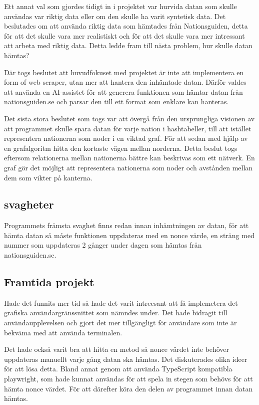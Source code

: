 \documentclass[a4paper, 12pt]{article}
\begin{document}
        Ett annat val som gjordes tidigt in i projektet var hurvida datan som skulle användas var riktig data eller om den skulle ha varit syntetisk data. Det beslutades om att använda riktig data som hämtades från Nationsguiden, detta för att det skulle vara mer realistiskt och för att det skulle vara mer intressant att arbeta med riktig data. Detta ledde fram till nästa problem, hur skulle datan hämtas? 


        Där togs beslutet att huvudfokuset med projektet är inte att implementera en form of web scraper, utan mer att hantera den inhämtade datan. Därför valdes att använda en AI-assistet för att generera funktionen som hämtar datan från nationsguiden.se och parsar den till ett format som enklare kan hanteras.

        
        Det sista stora beslutet som togs var att övergå från den ursprungliga visionen av att programmet skulle spara datan för varje nation i hashtabeller, till att istället representera nationerna som noder i en viktad graf. För att sedan med hjälp av en grafalgoritm hitta den kortaste vägen mellan norderna. Detta beslut togs eftersom relationerna mellan nationerna bättre kan beskrivas som ett nätverk. En graf gör det möjligt att representera nationerna som noder och avstånden mellan dem som vikter på kanterna. 

    \subsection{svagheter}
    \label{subsec: svagheter}
        Programmets främsta svaghet finns redan innan inhämtningen av datan, för att hämta datan så måste funktionen uppdateras med en nonce värde, en sträng med nummer som uppdateras 2 gånger under dagen som hämtas från nationsguiden.se. 

    \subsection{Framtida projekt}
    \label{subsec: framtid}
        Hade det funnits mer tid så hade det varit intreesant att få implemetera det grafiska användargränssnittet som nämndes under. Det hade bidragit till användaupplevelsen och gjort det mer tillgängligt för användare som inte är bekväma med att använda terminalen.


        Det hade också varit bra att hitta en metod så nonce värdet inte behöver uppdateras manuellt varje gång datan ska hämtas. Det diskuterades olika ideer för att lösa detta. Bland annat genom att använda TypeScript kompatibla playwright, som hade kunnat användas för att spela in stegen som behövs för att hämta nonce värdet. För att därefter köra den delen av programmet innan datan hämtas.
\end{document}
